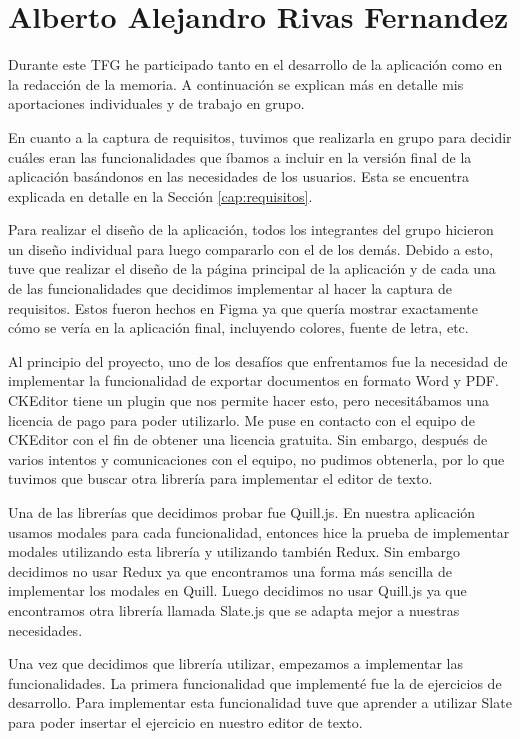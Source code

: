 \section{Alberto Alejandro Rivas Fernandez}
Durante este TFG he participado tanto en el desarrollo de la aplicación como en la redacción de la memoria. A continuación se explican más en detalle mis aportaciones individuales y de trabajo en grupo.

En cuanto a la captura de requisitos, tuvimos que realizarla en grupo para decidir cuáles eran las funcionalidades que íbamos a incluir en la versión final de la aplicación basándonos en las necesidades de los usuarios. Esta se encuentra explicada en detalle en la Sección \ref{cap:requisitos}.

Para realizar el diseño de la aplicación, todos los integrantes del grupo hicieron un diseño individual para luego compararlo con el de los demás. Debido a esto, tuve que realizar el diseño de la página principal de la aplicación y de cada una de las funcionalidades que decidimos implementar al hacer la captura de requisitos. Estos fueron hechos en Figma ya que quería mostrar exactamente cómo se vería en la aplicación final, incluyendo colores, fuente de letra, etc.

Al principio del proyecto, uno de los desafíos que enfrentamos fue la necesidad de implementar la funcionalidad de exportar documentos en formato Word y PDF. CKEditor tiene un plugin que nos permite hacer esto, pero necesitábamos una licencia de pago para poder utilizarlo. Me puse en contacto con el equipo de CKEditor con el fin de obtener una licencia gratuita. Sin embargo, después de varios intentos y comunicaciones con el equipo, no pudimos obtenerla, por lo que tuvimos que buscar otra librería para implementar el editor de texto.

Una de las librerías que decidimos probar fue Quill.js. En nuestra aplicación usamos modales para cada funcionalidad, entonces hice la prueba de implementar modales utilizando esta librería y utilizando también Redux. Sin embargo decidimos no usar Redux ya que encontramos una forma más sencilla de implementar los modales en Quill. Luego decidimos no usar Quill.js ya que encontramos otra librería llamada Slate.js que se adapta mejor a nuestras necesidades.

Una vez que decidimos que librería utilizar, empezamos a implementar las funcionalidades. La primera funcionalidad que implementé fue la de ejercicios de desarrollo. Para implementar esta funcionalidad tuve que aprender a utilizar Slate para poder insertar el ejercicio en nuestro editor de texto.

